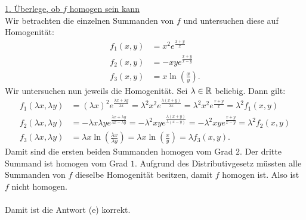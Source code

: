 \underline{1. Überlege, ob $ f $ homogen sein kann}\\
Wir betrachten die einzelnen Summanden von $ f $ und untersuchen diese auf Homogenität:
\begin{align*}
	f_1(x,y)
	&=
	x^2 e^{\frac{x+y}{x}}\\
	f_2(x,y)
	&=
	-
	xy e^{\frac{x+y}{x-y}}\\
	f_3(x,y)
	&=
	x \ln \left( \frac{x}{y} \right).
\end{align*} 
Wir untersuchen nun jeweils die Homogenität.
Sei $ \lambda \in \mathbb{R} $ beliebig. Dann gilt:
\begin{align*}
	f_1(\lambda x, \lambda y)
	&=
	(\lambda x)^2 e^{\frac{\lambda x+ \lambda y} { \lambda x}}
	=
	\lambda^2 x^2 e^{\frac{\lambda( x+  y) } { \lambda x}}
	=
	\lambda^2 x^2 e^{\frac{x+y}{x}} 
	= \lambda^2 f_1(x,y)
	\\
	f_2(\lambda x, \lambda y)
	&=
	-
	\lambda x \lambda y e^{\frac{\lambda x+ \lambda y}{ \lambda x- \lambda y}}
	=
	-
	\lambda^2 xy e^{\frac{\lambda (x+  y)}{ \lambda (x-  y)}}
	=
	-
	\lambda^2 xy e^{\frac{x+  y}{  x-  y}}
	=
	\lambda^2 f_2(x,y)\\
	f_3(\lambda x, \lambda y)
	&=
	\lambda x \ln \left( \frac{\lambda x}{ \lambda y} \right)
	=
	\lambda x \ln \left( \frac{ x}{ y} \right)
	=
	\lambda f_3(x,y).
\end{align*}
Damit sind die ersten beiden Summanden homogen vom Grad $ 2 $.
Der dritte Summand ist homogen vom Grad $ 1 $. Aufgrund des Distributivgesetz müssten alle Summanden von $ f $ dieselbe Homogenität besitzen, damit $ f $ homogen ist. Also ist $ f $ nicht homogen.\\
\\
Damit ist die Antwort (e) korrekt.


\newpage


